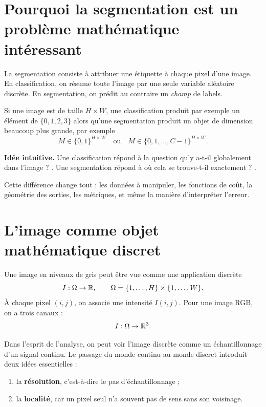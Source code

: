 \documentclass[11pt]{article}
\begin{document}

\tableofcontents
\newpage

\section{Pourquoi la segmentation est un problème mathématique intéressant}
La segmentation consiste à attribuer une étiquette à chaque pixel d'une image. En classification, on résume toute l'image par une seule variable aléatoire discrète. En segmentation, on prédit au contraire un \emph{champ} de labels.

Si une image est de taille $H\times W$, une classification produit par exemple un élément de $\{0,1,2,3\}$ alors qu'une segmentation produit un objet de dimension beaucoup plus grande, par exemple
\[
M \in \{0,1\}^{H\times W}
\quad\text{ou}\quad
M \in \{0,1,\dots,C-1\}^{H\times W}.
\]

\begin{ideaBox}
\textbf{Idée intuitive.} Une classification répond à la question \og qu'y a-t-il globalement dans l'image ? \fg. Une segmentation répond à \og où cela se trouve-t-il exactement ? \fg.
\end{ideaBox}

Cette différence change tout : les données à manipuler, les fonctions de coût, la géométrie des sorties, les métriques, et même la manière d'interpréter l'erreur.

\section{L'image comme objet mathématique discret}
Une image en niveaux de gris peut être vue comme une application discrète
\[
I : \Omega \to \mathbb{R},
\qquad \Omega = \{1,\dots,H\}\times\{1,\dots,W\}.
\]
À chaque pixel $(i,j)$, on associe une intensité $I(i,j)$. Pour une image RGB, on a trois canaux :
\[
I : \Omega \to \mathbb{R}^3.
\]

Dans l'esprit de l'analyse, on peut voir l'image discrète comme un échantillonnage d'un signal continu. Le passage du monde continu au monde discret introduit deux idées essentielles :
\begin{enumerate}[label=\arabic*)]
  \item la \textbf{résolution}, c'est-à-dire le pas d'échantillonnage ;
  \item la \textbf{localité}, car un pixel seul n'a souvent pas de sens sans son voisinage.
\end{enumerate}
\end{document}
